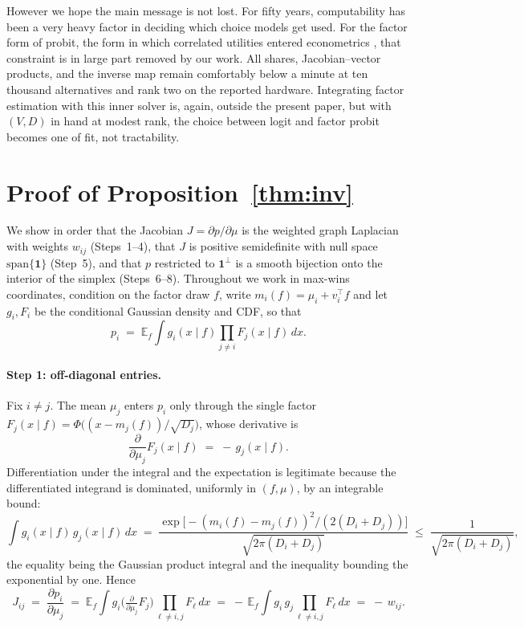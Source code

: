 \documentclass[12pt]{article}
\theoremstyle{remark}
\newcommand{\E}{\mathbb{E}}
\begin{document}
However we hope the main message is not lost. For fifty years, computability has been a very heavy factor in deciding which choice models get used. For
the factor form of probit, the form in which correlated utilities entered
econometrics \citep{hausman1978}, that constraint is in large part removed by our work. All shares, Jacobian--vector products, and
the inverse map remain comfortably below a minute at ten thousand alternatives and
rank two on the reported hardware. Integrating
factor estimation with this inner solver is, again, outside the present paper,
but with $(V, D)$ in hand at modest rank, the choice between logit and
factor probit becomes one of fit, not tractability.

\appendix
\section{Proof of Proposition~\ref{thm:inv}}\label{app:inv}

We show in order that the Jacobian $J = \partial p/\partial\mu$ is the
weighted graph Laplacian with weights $w_{ij}$ (Steps~1--4), that $J$ is
positive semidefinite with null space $\mathrm{span}\{\mathbf{1}\}$
(Step~5), and that $p$ restricted to $\mathbf{1}^\perp$ is a smooth
bijection onto the interior of the simplex (Steps~6--8). Throughout we
work in max-wins coordinates, condition on the factor draw $f$, write
$m_i(f) = \mu_i + v_i^\top f$ and let $g_i, F_i$ be the conditional
Gaussian density and CDF, so that
\[
p_i \;=\; \E_f \int g_i(x\mid f)\prod_{j\ne i} F_j(x\mid f)\,dx .
\]

\paragraph{Step 1: off-diagonal entries.} Fix $i\ne j$. The mean $\mu_j$
enters $p_i$ only through the single factor
$F_j(x\mid f) = \Phi\big((x - m_j(f))/\sqrt{D_j}\big)$, whose derivative is
\[
\frac{\partial}{\partial \mu_j} F_j(x\mid f) \;=\; -\,g_j(x\mid f).
\]
Differentiation under the integral and the expectation is legitimate
because the differentiated integrand is dominated, uniformly in
$(f,\mu)$, by an integrable bound:
\[
\int g_i(x\mid f)\, g_j(x\mid f)\,dx
\;=\; \frac{\exp\!\big[-(m_i(f)-m_j(f))^2 / (2(D_i+D_j))\big]}
{\sqrt{2\pi(D_i+D_j)}}
\;\le\; \frac{1}{\sqrt{2\pi(D_i+D_j)}} ,
\]
the equality being the Gaussian product integral and the inequality
bounding the exponential by one. Hence
\[
J_{ij} \;=\; \frac{\partial p_i}{\partial \mu_j}
\;=\; \E_f \int g_i \Big(\tfrac{\partial}{\partial\mu_j}F_j\Big)
\prod_{\ell\ne i,j}F_\ell\,dx
\;=\; -\,\E_f \int g_i\, g_j \prod_{\ell\ne i,j} F_\ell\,dx
\;=\; -\,w_{ij}.
\]
\end{document}
